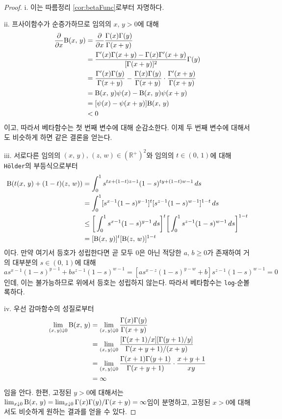 \begin{proof}
    i. 이는 따름정리 \ref{cor:betaFunc}로부터 자명하다.

    ii. 프사이함수가 순증가하므로 임의의 $x,\,y>0$에 대해
    \begin{align*}
        \frac{\partial}{\partial x}\mathrm{B}(x,\,y)&=\frac{\partial}{\partial x}\frac{\Gamma(x)\Gamma(y)}{\Gamma(x+y)}\\
        &=\frac{\Gamma'(x)\Gamma(x+y)-\Gamma(x)\Gamma'(x+y)}{[\Gamma(x+y)]^2}\Gamma(y)\\
        &=\frac{\Gamma'(x)\Gamma(y)}{\Gamma(x+y)}-\frac{\Gamma(x)\Gamma(y)}{\Gamma(x+y)}\cdot\frac{\Gamma'(x+y)}{\Gamma(x+y)}\\
        &=\mathrm{B}(x,\,y)\psi(x)-\mathrm{B}(x,\,y)\psi(x+y)\\
        &=[\psi(x)-\psi(x+y)]\mathrm{B}(x,\,y)\\
        &<0
    \end{align*}
    이고, 따라서 베타함수는 첫 번째 변수에 대해 순감소한다. 이제 두 번째 변수에 대해서도 비슷하게 하면 같은 결론을 얻는다.

    iii. 서로다른 임의의 $(x,\,y),\,(z,\,w)\in(\mathbb{R}^+)^2$와 임의의 $t\in(0,\,1)$에 대해 \texttt{H\"older}의 부등식으로부터
    \begin{align*}
        \mathrm{B}(t(x,\,y)+(1-t)(z,\,w))&=\int_0^1s^{tx+(1-t)z-1}(1-s)^{ty+(1-t)w-1}\,ds\\
        &=\int_0^1[s^{x-1}(1-s)^{y-1}]^t[s^{z-1}(1-s)^{w-1}]^{1-t}\,ds\\
        &\leq\bigg[\int_0^1 s^{x-1}(1-s)^{y-1}\,ds\bigg]^t\bigg[\int_0^1 s^{z-1}(1-s)^{w-1}\,ds\bigg]^{1-t}\\
        &=[\mathrm{B}(x,\,y)]^t[\mathrm{B}(z,\,w)]^{1-t}
    \end{align*}
    이다. 만약 여기서 등호가 성립한다면 곧 모두 $0$은 아닌 적당한 $a,\,b\geq0$가 존재하여 거의 대부분의 $s\in(0,\,1)$에 대해 $as^{x-1}(1-s)^{y-1}+bs^{z-1}(1-s)^{w-1}=[as^{x-z}(1-s)^{y-w}+b]s^{z-1}(1-s)^{w-1}=0$인데, 이는 불가능하므로 위에서 등호는 성립하지 않는다. 따라서 베타함수는 \texttt{log}-순볼록하다.

    iv. 우선 감마함수의 성질로부터
    \begin{align*}
        \lim_{(x,\,y)\downarrow0}\mathrm{B}(x,\,y)&=\lim_{(x,\,y)\downarrow0}\frac{\Gamma(x)\Gamma(y)}{\Gamma(x+y)}\\
        &=\lim_{(x,\,y)\downarrow0}\frac{[\Gamma(x+1)/x][\Gamma(y+1)/y]}{\Gamma(x+y+1)/(x+y)}\\
        &=\lim_{(x,\,y)\downarrow0}\frac{\Gamma(x+1)\Gamma(y+1)}{\Gamma(x+y+1)}\cdot\frac{x+y+1}{xy}\\
        &=\infty
    \end{align*}
    임을 안다. 한편, 고정된 $y>0$에 대해서는 $\lim_{x\downarrow0}\mathrm{B}(x,\,y)=\lim_{x\downarrow0}\Gamma(x)\Gamma(y)/\Gamma(x+y)=\infty$임이 분명하고, 고정된 $x>0$에 대해서도 비슷하게 원하는 결과를 얻을 수 있다.


\end{proof}
